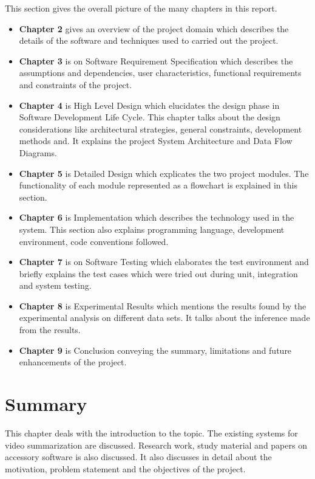 This section gives the overall picture of the many chapters in this report.

\begin{itemize}
    \item \textbf{Chapter 2} gives an overview of the project domain which
    describes the details of the software and techniques used to carried out
    the project.

    \item \textbf{Chapter 3} is on Software Requirement Specification which
    describes the assumptions and dependencies, user characteristics,
    functional requirements and constraints of the project.

    \item \textbf{Chapter 4} is High Level Design which elucidates the design
    phase in Software Development Life Cycle. This chapter talks about the
    design considerations like architectural strategies, general constraints,
    development methods and. It explains the project System Architecture and
    Data Flow Diagrams.

    \item \textbf{Chapter 5} is Detailed Design which explicates the two
    project modules. The functionality of each module represented as a
    flowchart is explained in this section.

    \item \textbf{Chapter 6} is Implementation which describes the technology
    used in the system. This section also explains programming language,
    development environment, code conventions followed.

    \item \textbf{Chapter 7} is on Software Testing which elaborates the test
    environment and briefly explains the test cases which were tried out during
    unit, integration and system testing.

    \item \textbf{Chapter 8} is Experimental Results which mentions the results
    found by the experimental analysis on different data sets. It talks about
    the inference made from the results.

    \item \textbf{Chapter 9} is Conclusion conveying the summary, limitations
    and future enhancements of the project.
\end{itemize}


\section{Summary}

This chapter deals with the introduction to the topic. The existing systems for
video summarization are discussed. Research work, study material and papers on
accessory software is also discussed. It also discusses in detail about the
motivation, problem statement and the objectives of the project.